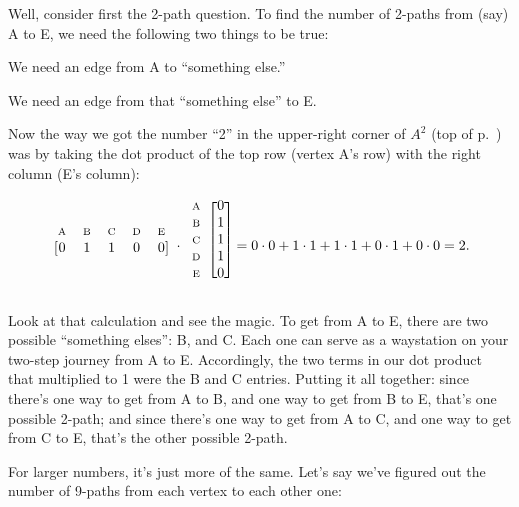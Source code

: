 Well, consider first the 2-path question. To find the number of 2-paths from
(say) A to E, we need the following two things to be true:

\begin{compactenum}
\item We need an edge from A to ``something else.''
\item We need an edge from that ``something else'' to E.
\end{compactenum}

Now the way we got the number ``2'' in the upper-right corner of $A^2$ (top of
p.~\pageref{adjacencySquared}) was by taking the dot product of the top row
(vertex A's row) with the right column (E's column):

\[
\begin{blockarray}{ccccc}
{\scriptsize\textrm{A}} & {\scriptsize\textrm{B}} & {\scriptsize\textrm{C}} & {\scriptsize\textrm{D}} & {\scriptsize\textrm{E}} \\
\begin{block}{[ccccc]}
 0 & 1 & 1 & 0 & 0 \\
\end{block}
\end{blockarray} \cdot
\begin{blockarray}{cc}
\begin{block}{c[c]}
{\scriptsize\textrm{A}} & 0 \\
{\scriptsize\textrm{B}} & 1 \\
{\scriptsize\textrm{C}} & 1 \\
{\scriptsize\textrm{D}} & 1 \\
{\scriptsize\textrm{E}} & 0 \\
\end{block}
\end{blockarray} = 0\cdot 0 + 1\cdot 1 + 1\cdot 1 + 0\cdot 1 + 0\cdot 0 = 2.
\]

Look at that calculation and see the magic. To get from A to E, there are two
possible ``something elses'': B, and C. Each one can serve as a waystation on
your two-step journey from A to E. Accordingly, the two terms in our dot
product that multiplied to 1 were the B and C entries. Putting it all together:
since there's one way to get from A to B, and one way to get from B to E,
that's one possible 2-path; and since there's one way to get from A to C, and
one way to get from C to E, that's the other possible 2-path.

\smallskip

For larger numbers, it's just more of the same. Let's say we've figured out the
number of 9-paths from each vertex to each other one:


